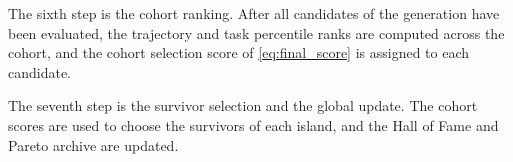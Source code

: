The sixth step is the cohort ranking. After all candidates of the generation have been evaluated, the trajectory and task percentile ranks are computed across the cohort, and the cohort selection score of \eqref{eq:final_score} is assigned to each candidate.

The seventh step is the survivor selection and the global update. The cohort scores are used to choose the survivors of each island, and the Hall of Fame and Pareto archive are updated.

